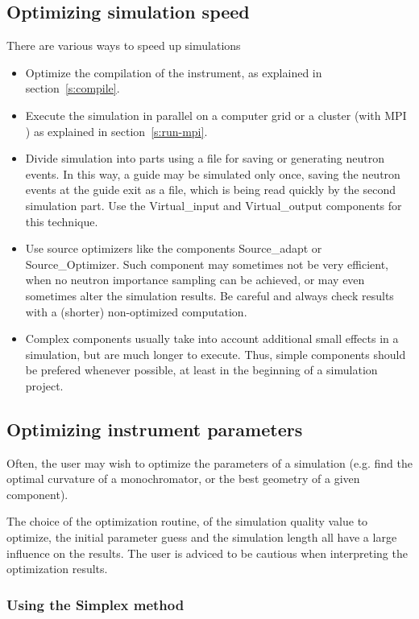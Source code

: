 \subsection{Optimizing simulation speed}
\label{s:optim}
There are various ways to speed up simulations
\begin{itemize}
\item Optimize the compilation of the instrument, as explained in section~\ref{s:compile}.
\item Execute the simulation in parallel on a computer grid or a cluster (with MPI
) as explained in section~\ref{s:run-mpi}.
\item Divide simulation into parts using a file for saving or generating neutron
      events. In this way, a guide may be simulated only once, saving the neutron events
      at the guide exit as a file, which is being read quickly by the second simulation
      part. Use the Virtual\_input and Virtual\_output components for this technique.
\item Use source optimizers like the components Source\_adapt or
      Source\_Optimizer. Such component may sometimes not be very efficient, when no
      neutron importance sampling can be achieved, or may even sometimes alter the
      simulation results. Be careful and always check results with a
      (shorter) non-optimized
      computation.
\item Complex components usually take into account additional small effects in a simulation,
      but are much longer to execute. Thus, simple components should be prefered
      whenever possible, at least in the beginning of a simulation project.
\end{itemize}

\subsection{Optimizing instrument parameters}
\label{s:optimize}
Often, the user may wish to optimize the parameters of a simulation (e.g. find the optimal curvature of a monochromator, or the best geometry of a given component).

The choice of the optimization routine, of the simulation quality
value to optimize, the initial parameter guess and the simulation
length all have a large influence on the results.
The user is adviced to be cautious when interpreting the optimization results.

\subsubsection{Using the Simplex method}

